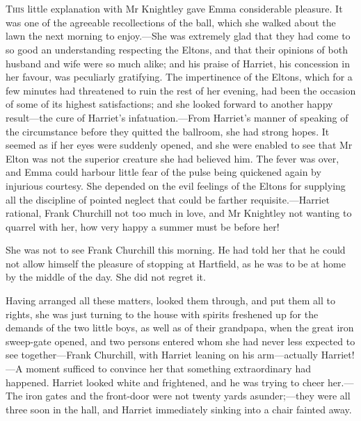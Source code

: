 \chapter[Chapter \thechapter]{}
\lettrine[lraise=0.3]{T}{his} little explanation with Mr Knightley gave Emma considerable pleasure. It was one of the agreeable recollections of the ball, which she walked about the lawn the next morning to enjoy.—She was extremely glad that they had come to so good an understanding respecting the Eltons, and that their opinions of both husband and wife were so much alike; and his praise of Harriet, his concession in her favour, was peculiarly gratifying. The impertinence of the Eltons, which for a few minutes had threatened to ruin the rest of her evening, had been the occasion of some of its highest satisfactions; and she looked forward to another happy result—the cure of Harriet's infatuation.—From Harriet's manner of speaking of the circumstance before they quitted the ballroom, she had strong hopes. It seemed as if her eyes were suddenly opened, and she were enabled to see that Mr Elton was not the superior creature she had believed him. The fever was over, and Emma could harbour little fear of the pulse being quickened again by injurious courtesy. She depended on the evil feelings of the Eltons for supplying all the discipline of pointed neglect that could be farther requisite.—Harriet rational, Frank Churchill not too much in love, and Mr Knightley not wanting to quarrel with her, how very happy a summer must be before her!

She was not to see Frank Churchill this morning. He had told her that he could not allow himself the pleasure of stopping at Hartfield, as he was to be at home by the middle of the day. She did not regret it.

Having arranged all these matters, looked them through, and put them all to rights, she was just turning to the house with spirits freshened up for the demands of the two little boys, as well as of their grandpapa, when the great iron sweep-gate opened, and two persons entered whom she had never less expected to see together—Frank Churchill, with Harriet leaning on his arm—actually Harriet!—A moment sufficed to convince her that something extraordinary had happened. Harriet looked white and frightened, and he was trying to cheer her.—The iron gates and the front-door were not twenty yards asunder;—they were all three soon in the hall, and Harriet immediately sinking into a chair fainted away.

